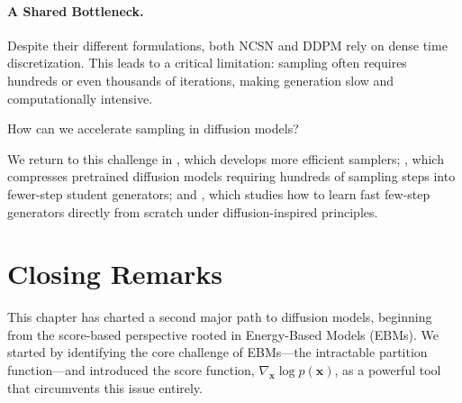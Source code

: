 \paragraph{A Shared Bottleneck.}
Despite their different formulations, both NCSN and DDPM rely on dense time discretization. This leads to a critical limitation: sampling often requires hundreds or even thousands of iterations, making generation slow and computationally intensive.

\begin{question}\label{ques:dm-sampling-slow}
    How can we accelerate sampling in diffusion models?
\end{question}

We return to this challenge in , which develops more efficient samplers; , which compresses pretrained diffusion models requiring hundreds of sampling steps into fewer-step student generators; and , which studies how to learn fast few-step generators directly from scratch under diffusion-inspired principles.




\newpage

\section{Closing Remarks}\label{sec:ch3_cr}



This chapter has charted a second major path to diffusion models, beginning from the score-based perspective rooted in Energy-Based Models (EBMs). We started by identifying the core challenge of EBMs—the intractable partition function—and introduced the score function, $\nabla_{\mathbf{x}}\log{p(\mathbf{x})}$, as a powerful tool that circumvents this issue entirely.


